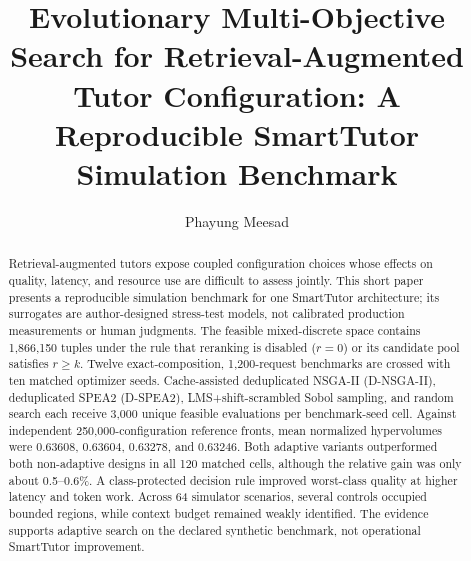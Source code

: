 \documentclass[runningheads]{llncs}
\begin{document}
\title{Evolutionary Multi-Objective Search for Retrieval-Augmented Tutor Configuration: A Reproducible SmartTutor Simulation Benchmark}

\author{Phayung Meesad}


\maketitle

\begin{abstract}
Retrieval-augmented tutors expose coupled configuration choices whose effects on quality, latency, and resource use are difficult to assess jointly. This short paper presents a reproducible simulation benchmark for one SmartTutor architecture; its surrogates are author-designed stress-test models, not calibrated production measurements or human judgments. The feasible mixed-discrete space contains 1,866,150 tuples under the rule that reranking is disabled ($r=0$) or its candidate pool satisfies $r\geq k$. Twelve exact-composition, 1,200-request benchmarks are crossed with ten matched optimizer seeds. Cache-assisted deduplicated NSGA-II (D-NSGA-II), deduplicated SPEA2 (D-SPEA2), LMS+shift-scrambled Sobol sampling, and random search each receive 3,000 unique feasible evaluations per benchmark-seed cell. Against independent 250,000-configuration reference fronts, mean normalized hypervolumes were 0.63608, 0.63604, 0.63278, and 0.63246. Both adaptive variants outperformed both non-adaptive designs in all 120 matched cells, although the relative gain was only about 0.5--0.6\%. A class-protected decision rule improved worst-class quality at higher latency and token work. Across 64 simulator scenarios, several controls occupied bounded regions, while context budget remained weakly identified. The evidence supports adaptive search on the declared synthetic benchmark, not operational SmartTutor improvement.

\end{abstract}
\end{document}
